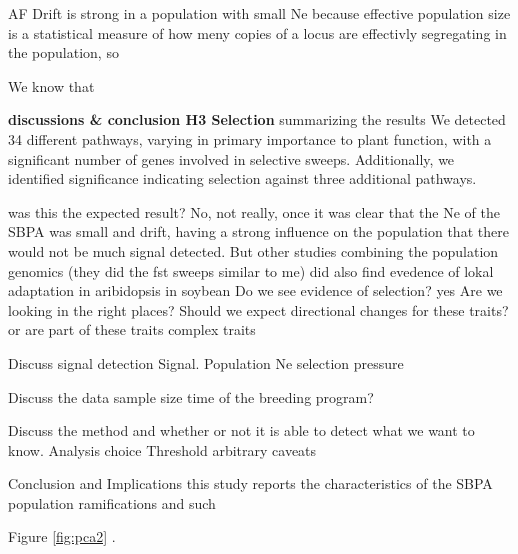 \documentclass[9pt, twocolumn,twoside]{gsajnl}
\begin{document}
AF
Drift is strong in a population with small Ne because effective population size is a statistical measure of how meny copies of a locus are effectivly segregating in the population, so 

We know that 

\textbf{discussions \& conclusion H3 Selection}
summarizing the results
We detected 34 different pathways, varying in primary importance to plant function, with a significant number of genes involved in selective sweeps. Additionally, we identified significance indicating selection against three additional pathways.


was this the expected result? No, not really, once it was clear that the Ne of the SBPA was small and drift, having a strong influence on the population that there would not be much signal detected. 
But other studies combining the population genomics (they did the fst sweeps similar to me) did also find evedence of lokal adaptation in aribidopsis \cite{price18}in soybean \cite{FIND} 
Do we see evidence of selection? 
yes
Are we looking in the right places?
Should we expect directional changes for these traits? or are part of these traits complex  traits 

Discuss signal detection
Signal. Population
Ne
selection pressure 

Discuss the data
sample size
time of the breeding program?

Discuss the method and whether or not it is able to detect what we want to know. 
Analysis choice
Threshold arbitrary
caveats


Conclusion and Implications
this study reports the characteristics of the SBPA population  
ramifications and such



Figure \ref{fig:pca2} .
\end{document}
